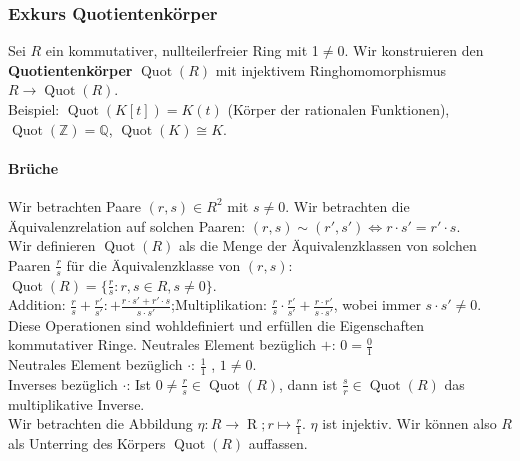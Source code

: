 \documentclass[12pt,a4paper]{article}
\theoremstyle{plain}
\newcommand{\Z}{\mathbb{Z}}
\newcommand{\Q}{\mathbb{Q}}
\numberwithin{equation}{section}
\begin{document}
\subsubsection{Exkurs Quotientenk\"orper}
Sei $R$ ein kommutativer, nullteilerfreier Ring mit 1$\neq 0$. Wir konstruieren den \textbf{Quotientenk\"orper} $\operatorname{Quot}(R)$ mit injektivem Ringhomomorphismus $R \rightarrow \operatorname{Quot}(R)$. \\
Beispiel: $\operatorname{Quot}(K[t]) = K(t)$ (K\"orper der rationalen Funktionen), $\operatorname{Quot}(\Z) = \Q$, $\operatorname{Quot}(K) \cong K$.
\paragraph*{\glqq Br\"uche\grqq\ } Wir betrachten Paare $(r,s)\in R^2$ mit $s\neq 0$. Wir betrachten die \"Aquivalenzrelation auf solchen Paaren: $(r,s) \sim (r',s') \Leftrightarrow r\cdot s' = r'\cdot s$.\\
Wir definieren $\operatorname{Quot}(R)$ als die Menge der \"Aquivalenzklassen von solchen Paaren $\frac{r}{s}$ f\"ur die \"Aquivalenzklasse von $(r,s)$:\\
$\operatorname{Quot}(R)=\{\frac{r}{s}:r,s\in R, s\neq 0 \}$. \\
Addition: $\frac{r}{s}+\frac{r'}{s'}:+\frac{r\cdot s'+r'\cdot s}{s\cdot s'}$;\quad Multiplikation: $\frac{r}{s}\cdot\frac{r'}{s'}+\frac{r\cdot r'}{s\cdot s'}$, wobei immer $s\cdot s'\neq 0$. \\
Diese Operationen sind wohldefiniert und erf\"ullen die Eigenschaften kommutativer Ringe.
Neutrales Element bez\"uglich $+$: $0=\frac{0}{1}$ \\
Neutrales Element bez\"uglich $\cdot$: $\frac{1}{1}$ , $1\neq 0$. \\
Inverses bez\"uglich $\cdot$: Ist $0\neq \frac{r}{s} \in \operatorname{Quot}(R)$, dann ist $\frac{s}{r} \in \operatorname{Quot}(R)$ das multiplikative Inverse.\\
Wir betrachten die Abbildung $\eta: R \rightarrow \operatorname{R}; r\mapsto \frac{r}{1}$. $\eta$ ist injektiv. Wir k\"onnen also $R$ als Unterring des K\"orpers $\operatorname{Quot}(R)$ auffassen.
\end{document}
